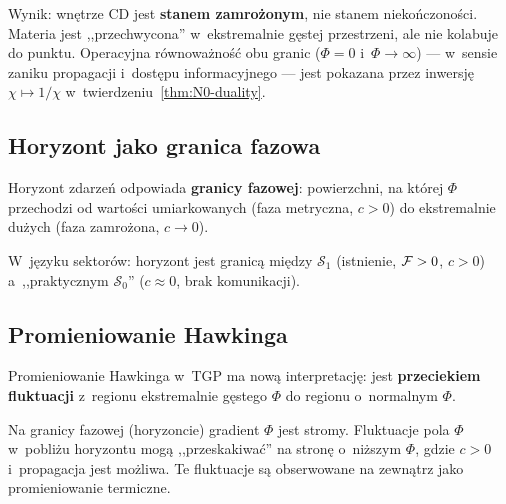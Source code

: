 Wynik: wn\k{e}trze CD jest \textbf{stanem zamro\.zonym}, nie
stanem nieko\'nczono\'sci. Materia jest ,,przechwycona'' w~ekstremalnie
g\k{e}stej przestrzeni, ale nie kolabuje do punktu.
Operacyjna r\'ownowa\.zno\'s\'c obu granic ($\Phi = 0$
i~$\Phi \to \infty$) --- w~sensie zaniku propagacji
i~dost\k{e}pu informacyjnego --- jest pokazana przez
inwersj\k{e} $\chi \mapsto 1/\chi$
w~twierdzeniu~\ref{thm:N0-duality}.

\subsection{Horyzont jako granica fazowa}\label{ssec:cd-horyzont}

Horyzont zdarze\'n odpowiada \textbf{granicy fazowej}: powierzchni,
na kt\'orej $\Phi$ przechodzi od warto\'sci umiarkowanych
(faza metryczna, $c > 0$) do ekstremalnie du\.zych
(faza zamro\.zona, $c \to 0$).

W~j\k{e}zyku sektor\'ow: horyzont jest granic\k{a} mi\k{e}dzy
$\mathcal{S}_1$ (istnienie, $\mathcal{F} > 0$, $c > 0$)
a~,,praktycznym $\mathcal{S}_0$'' ($c \approx 0$, brak
komunikacji).

\subsection{Promieniowanie Hawkinga}\label{ssec:cd-hawking}

Promieniowanie Hawkinga w~TGP ma now\k{a} interpretacj\k{e}:
jest \textbf{przeciekiem fluktuacji} z~regionu ekstremalnie
g\k{e}stego $\Phi$ do regionu o~normalnym $\Phi$.

Na granicy fazowej (horyzoncie) gradient $\Phi$ jest stromy.
Fluktuacje pola $\Phi$ w~pobli\.zu horyzontu mog\k{a}
,,przeskakiwa\'c'' na stron\k{e} o~ni\.zszym $\Phi$, gdzie $c > 0$
i~propagacja jest mo\.zliwa. Te fluktuacje s\k{a} obserwowane
na zewn\k{a}trz jako promieniowanie termiczne.

